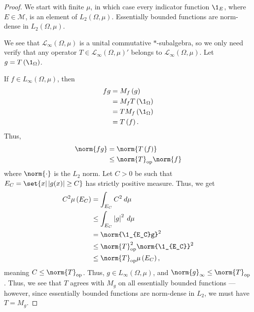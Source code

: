 \documentclass[10pt]{mypackage}
\begin{document}
\begin{proof}
  We start with finite $\mu$, in which case every indicator function $\1_E$, where $E\in \mathcal{M}$, is an element of $L_2\left(\Omega,\mu\right)$. Essentially bounded functions are norm-dense in $L_2\left(\Omega,\mu\right)$.\newline

  We see that $\mathcal{L}_{\infty}\left(\Omega,\mu\right)$ is a unital commutative $\ast$-subalgebra, so we only need verify that any operator $T\in \mathcal{L}_{\infty}\left(\Omega,\mu\right)'$ belongs to $\mathcal{L}_{\infty}\left(\Omega,\mu\right)$. Let $g = T\left(\1_{\Omega}\right)$.\newline

  If $f\in L_{\infty}\left(\Omega,\mu\right)$, then
  \begin{align*}
    fg &= M_{f}\left(g\right)\\
       &= M_{f}T\left(\1_{\Omega}\right)\\
       &= TM_f\left(\1_{\Omega}\right)\\
       &= T\left(f\right).
  \end{align*}
  Thus,
  \begin{align*}
    \norm{fg} &= \norm{T\left(f\right)}\\
              &\leq \norm{T}_{\text{op}}\norm{f}
  \end{align*}
  where $\norm{\cdot}$ is the $L_2$ norm. Let $C > 0$ be such that $E_{C} = \set{x | \left\vert g(x) \right\vert \geq C}$ has strictly positive measure. Thus, we get
  \begin{align*}
    C^2\mu\left(E_C\right) &= \int_{E_C}^{} C^2\:d\mu\\
                           &\leq \int_{E_C}^{} \left\vert g \right\vert^2\:d\mu\\
                           &= \norm{\1_{E_C}g}^2\\
                           &\leq \norm{T}_{\text{op}}^2\norm{\1_{E_C}}^2\\
                           &\leq \norm{T}_{\text{op}}\mu\left(E_C\right),
  \end{align*}
  meaning $C \leq \norm{T}_{\text{op}}$. Thus, $g\in L_{\infty}\left(\Omega,\mu\right)$, and $\norm{g}_{\infty}\leq \norm{T}_{\text{op}}$. Thus, we see that $T$ agrees with $M_{g}$ on all essentially bounded functions --- however, since essentially bounded functions are norm-dense in $L_2$, we must have $T = M_g$.\newline


\end{proof}
\end{document}
